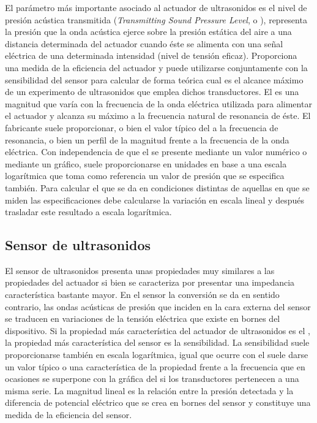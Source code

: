 \sshortpage{}

El parámetro más importante asociado al actuador de ultrasonidos es el
nivel de presión acústica transmitida (\emph{Transmitting Sound Pressure
Level}, o ), representa la presión que la onda acústica ejerce
sobre la presión estática del aire a una distancia determinada del actuador
cuando éste se alimenta con una señal eléctrica de una determinada
intensidad (nivel de tensión eficaz). Proporciona una medida de la
eficiencia del actuador y puede utilizarse conjuntamente con la
sensibilidad del sensor para calcular de forma teórica cual es el alcance
máximo de un experimento de ultrasonidos que emplea dichos transductores.
El  es una magnitud que varía con la frecuencia de la onda
eléctrica utilizada para alimentar el actuador y alcanza su máximo a la
frecuencia natural de resonancia de éste. El fabricante suele proporcionar,
o bien el valor típico del  a la frecuencia de resonancia, o bien
un perfil de la magnitud frente a la frecuencia de la onda eléctrica. Con
independencia de que el  se presente mediante un valor numérico o
mediante un gráfico, suele proporcionarse en unidades en base a una escala
logarítmica que toma como referencia un valor de presión que se especifica
también. Para calcular el  que se da en condiciones distintas de
aquellas en que se miden las especificaciones debe calcularse la variación
en escala lineal y después trasladar este resultado a escala logarítmica.


\subsection{Sensor de ultrasonidos}

El sensor de ultrasonidos presenta unas propiedades muy similares a las
propiedades del actuador si bien se caracteriza por presentar una
impedancia característica bastante mayor. En el sensor la conversión se da
en sentido contrario, las ondas acústicas de presión que inciden en la cara
externa del sensor se traducen en variaciones de la tensión eléctrica que
existe en bornes del dispositivo. Si la propiedad más característica del
actuador de ultrasonidos es el , la propiedad más característica
del sensor es la sensibilidad. La sensibilidad suele proporcionarse también
en escala logarítmica, igual que ocurre con el  suele darse un
valor típico o una característica de la propiedad frente a la frecuencia
que en ocasiones se superpone con la gráfica del  si los
transductores pertenecen a una misma serie. La magnitud lineal es la
relación entre la presión detectada y la diferencia de potencial eléctrico
que se crea en bornes del sensor y constituye una medida de la eficiencia
del sensor.


